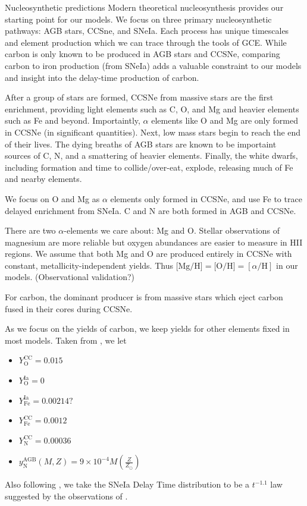 \documentclass[12pt,oneside]{report}
\begin{document}
Nucleosynthetic predictions 
Modern theoretical nucleosynthesis provides our starting point for our models.  We focus on three primary nucleosynthetic pathways: AGB stars, CCSne, and SNeIa. Each process has unique timescales and element production which we can trace through the tools of GCE. While carbon is only known to be produced in AGB stars and CCSNe, comparing carbon to iron production (from SNeIa) adds a valuable constraint to our models and insight into the delay-time production of carbon.

After a group of stars are formed, CCSNe from massive stars are the first enrichment, providing light elements such as C, O, and Mg and heavier elements such as Fe and beyond. Importaintly, $\alpha$ elements like O and Mg are only formed in CCSNe (in significant quantities). Next, low mass stars begin to reach the end of their lives. The dying breaths of AGB stars are known to be importaint sources of C, N, and a smattering of heavier elements.  Finally, the white dwarfs, including formation and time to collide/over-eat, explode, releasing much of Fe and nearby elements. 

We focus on O and Mg as $\alpha$ elements only formed in CCSNe, and use Fe to
trace delayed enrichment from SNeIa. C and N are both formed in AGB and CCSNe.

There are two $\alpha$-elements we care about: Mg and O. Stellar observations
of magnesium are more reliable but oxygen abundances are easier to measure in
HII regions. We assume that both Mg and O are produced entirely in CCSNe with
constant, metallicity-independent yields. Thus $\text{[Mg/H]} = \text{[O/H]} =
[\alpha/\text{H}]$ in our models. (Observational validation?)

For carbon, the dominant producer is from massive stars which eject carbon fused in their cores during CCSNe. 

As we focus on the yields of carbon, we keep yields for other elements fixed in
most models. Taken from \citet{james+21, james+22}, we let
\begin{itemize}
    \item $Y_\text{O}^\text{CC} = 0.015$
    \item $Y_\text{O}^\text{Ia} = 0$
    \item $Y_\text{Fe}^\text{Ia} = 0.00214?$
    \item $Y_\text{Fe}^\text{CC} = 0.0012$
    \item $Y_\text{N}^\text{CC} = 0.00036$
    \item $y_\text{N}^\text{AGB}(M, Z) = 9\times 10^{-4} M \left(\frac{Z}{Z_\odot}\right)$
\end{itemize}
Also following \citet{james+21, james+22}, we take the SNeIa Delay Time distribution to be a
$t^{-1.1}$ law suggested by the observations of \citet{maoz+12}.
\end{document}
